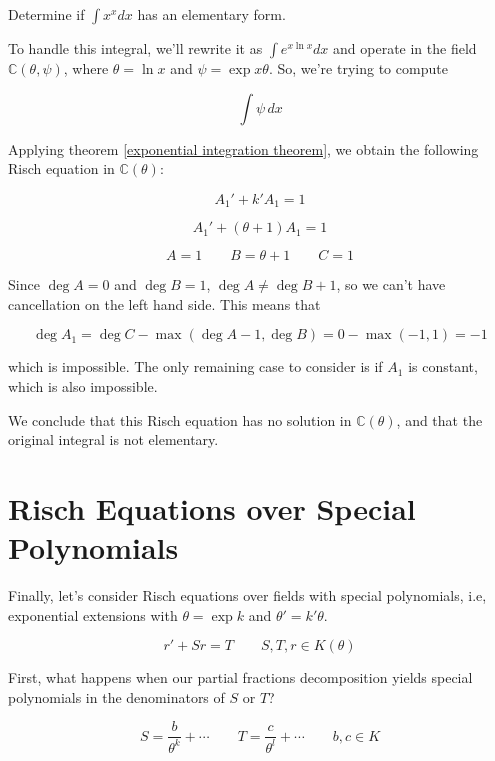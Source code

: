 \example Determine if $\int x^x dx$ has an elementary form.

To handle this integral, we'll rewrite it as $\int e^{x \ln x} dx$
and operate in the field ${\mathbb C}(\theta, \psi)$, where
$\theta = \ln x$ and $\psi = \exp x\theta$.  So, we're
trying to compute

$$\int \psi\, dx$$

Applying theorem \ref{exponential integration theorem}, we
obtain the following Risch equation in
${\mathbb C}(\theta)$:

$$A_1' + k' A_1 = 1$$

$$A_1' + (\theta + 1) A_1 = 1$$

$$A=1 \qquad B=\theta +1 \qquad C=1$$

Since $\deg A = 0$ and $\deg B=1$, $\deg A \ne \deg B + 1$,
so we can't have cancellation on the left hand side.
This means that

$$\deg A_1 = \deg C - \max(\deg A - 1, \deg B) = 0 - \max(-1, 1) = -1$$

which is impossible.  The only remaining case to consider
is if $A_1$ is constant, which is also impossible.

We conclude that this Risch equation has no solution
in ${\mathbb C}(\theta)$, and that the original integral
is not elementary.

\endexample

\vfill\eject
\section{Risch Equations over Special Polynomials}

Finally, let's consider Risch equations over fields
with special polynomials, i.e, exponential extensions
with $\theta = \exp k$ and $\theta' = k' \theta$.

$$r' + S r = T \qquad S,T,r \in K(\theta)$$

First, what happens when our partial
fractions decomposition yields special polynomials
in the denominators of $S$ or $T$?

$$S = \frac{b}{\theta^k} + \cdots \qquad T = \frac{c}{\theta^l} + \cdots \qquad b,c \in K$$




